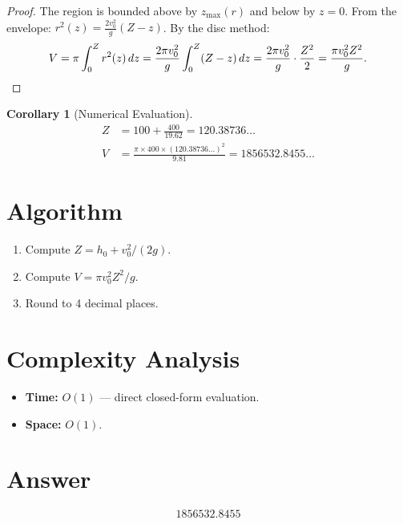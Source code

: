 \documentclass[12pt]{article}
\newtheorem{corollary}[theorem]{Corollary}
\begin{document}
\begin{proof}
The region is bounded above by $z_{\max}(r)$ and below by $z = 0$. From the envelope: $r^2(z) = \frac{2v_0^2}{g}(Z-z)$. By the disc method:
\[
    V = \pi\int_0^Z r^2(z)\,dz = \frac{2\pi v_0^2}{g}\int_0^Z (Z-z)\,dz = \frac{2\pi v_0^2}{g}\cdot\frac{Z^2}{2} = \frac{\pi v_0^2 Z^2}{g}. \qedhere
\]
\end{proof}

\begin{corollary}[Numerical Evaluation]
\begin{align*}
    Z &= 100 + \frac{400}{19.62} = 120.38736\ldots \\
    V &= \frac{\pi \times 400 \times (120.38736\ldots)^2}{9.81} = 1856532.8455\ldots
\end{align*}
\end{corollary}

\section{Algorithm}

\begin{enumerate}
    \item Compute $Z = h_0 + v_0^2/(2g)$.
    \item Compute $V = \pi v_0^2 Z^2 / g$.
    \item Round to 4 decimal places.
\end{enumerate}

\section{Complexity Analysis}

\begin{itemize}
    \item \textbf{Time:} $O(1)$ --- direct closed-form evaluation.
    \item \textbf{Space:} $O(1)$.
\end{itemize}

\section{Answer}

\[
\boxed{1856532.8455}
\]
\end{document}
